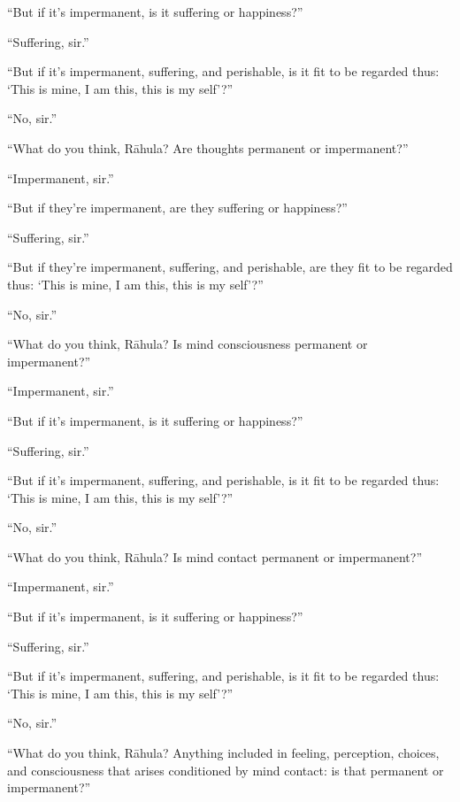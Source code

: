 \documentclass[12pt,openany]{book}%
\begin{document}
“But if it’s impermanent, is it suffering or happiness?” 

“Suffering, sir.” 

“But if it’s impermanent, suffering, and perishable, is it fit to be regarded thus: ‘This is mine, I am this, this is my self’?” 

“No, sir.” 

“What do you think, \textsanskrit{Rāhula}? Are thoughts permanent or impermanent?” 

“Impermanent, sir.” 

“But if they're impermanent, are they suffering or happiness?” 

“Suffering, sir.” 

“But if they're impermanent, suffering, and perishable, are they fit to be regarded thus: ‘This is mine, I am this, this is my self’?” 

“No, sir.” 

“What do you think, \textsanskrit{Rāhula}? Is mind consciousness permanent or impermanent?” 

“Impermanent, sir.” 

“But if it’s impermanent, is it suffering or happiness?” 

“Suffering, sir.” 

“But if it’s impermanent, suffering, and perishable, is it fit to be regarded thus: ‘This is mine, I am this, this is my self’?” 

“No, sir.” 

“What do you think, \textsanskrit{Rāhula}? Is mind contact permanent or impermanent?” 

“Impermanent, sir.” 

“But if it’s impermanent, is it suffering or happiness?” 

“Suffering, sir.” 

“But if it’s impermanent, suffering, and perishable, is it fit to be regarded thus: ‘This is mine, I am this, this is my self’?” 

“No, sir.” 

“What do you think, \textsanskrit{Rāhula}? Anything included in feeling, perception, choices, and consciousness that arises conditioned by mind contact: is that permanent or impermanent?” 
\end{document}
